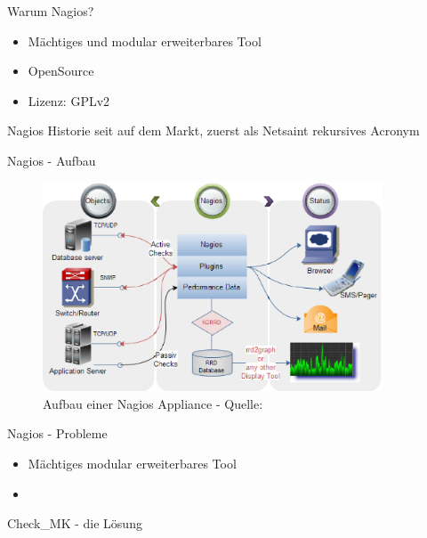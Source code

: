 \documentclass[12pt]{beamer}
\begin{document}
\begin{frame}{Warum Nagios?}
	\begin{itemize}
		\item Mächtiges und modular erweiterbares Tool
		\item OpenSource
		\item Lizenz: GPLv2
	\end{itemize}
\end{frame}
\begin{frame}{Nagios Historie}
	seit auf dem Markt, zuerst als Netsaint
	rekursives Acronym
	

\end{frame}
\begin{frame}{Nagios - Aufbau}
	\begin{figure}
		\centering
		\includegraphics[width=0.9\textwidth]{pics/NagiosMonitoring.eps}
		\caption[Grober Aufbau von Nagios]{Aufbau einer Nagios Appliance - Quelle: \textcite{nagiosaufbau}}
	\end{figure}
\end{frame}
\begin{frame}{Nagios - Probleme}
	\begin{itemize}
		\item Mächtiges modular erweiterbares Tool
		\item 
	\end{itemize}
\end{frame}
\begin{frame}{Check\_MK - die Lösung}
	
\end{frame}
\end{document}
